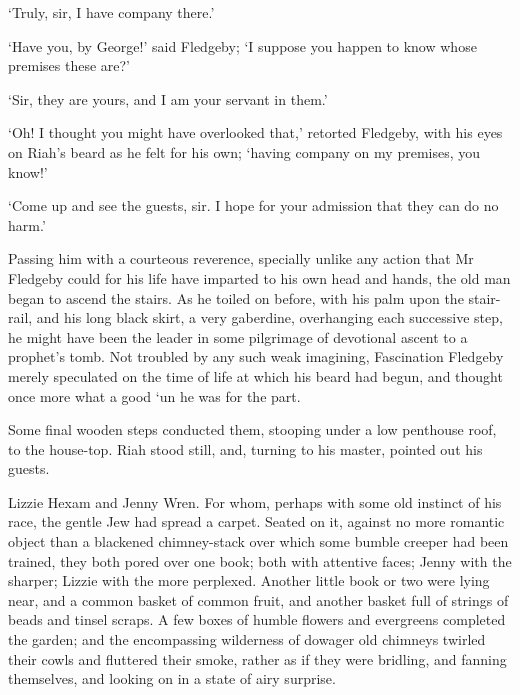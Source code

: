 ‘Truly, sir, I have company there.’

‘Have you, by George!’ said Fledgeby; ‘I suppose you happen to know
whose premises these are?’

‘Sir, they are yours, and I am your servant in them.’

‘Oh! I thought you might have overlooked that,’ retorted Fledgeby, with
his eyes on Riah’s beard as he felt for his own; ‘having company on my
premises, you know!’

‘Come up and see the guests, sir. I hope for your admission that they
can do no harm.’

Passing him with a courteous reverence, specially unlike any action that
Mr Fledgeby could for his life have imparted to his own head and hands,
the old man began to ascend the stairs. As he toiled on before, with his
palm upon the stair-rail, and his long black skirt, a very gaberdine,
overhanging each successive step, he might have been the leader in some
pilgrimage of devotional ascent to a prophet’s tomb. Not troubled by any
such weak imagining, Fascination Fledgeby merely speculated on the time
of life at which his beard had begun, and thought once more what a good
‘un he was for the part.

Some final wooden steps conducted them, stooping under a low penthouse
roof, to the house-top. Riah stood still, and, turning to his master,
pointed out his guests.

Lizzie Hexam and Jenny Wren. For whom, perhaps with some old instinct of
his race, the gentle Jew had spread a carpet. Seated on it, against
no more romantic object than a blackened chimney-stack over which some
bumble creeper had been trained, they both pored over one book; both
with attentive faces; Jenny with the sharper; Lizzie with the more
perplexed. Another little book or two were lying near, and a common
basket of common fruit, and another basket full of strings of beads and
tinsel scraps. A few boxes of humble flowers and evergreens completed
the garden; and the encompassing wilderness of dowager old chimneys
twirled their cowls and fluttered their smoke, rather as if they were
bridling, and fanning themselves, and looking on in a state of airy
surprise.

